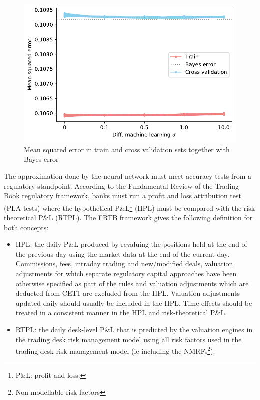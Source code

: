 \begin{figure}[H] 
\centering
\includegraphics[width=1.0\textwidth]{Figures/MarketRisk/train_test_mse.pdf}
\caption{Mean squared error in train and cross validation sets together with Bayes error}
\label{fig:MSE_CV_train_test}
\end{figure}

The approximation done by the neural network must meet accuracy tests from a regulatory standpoint. According to the Fundamental Review of the Trading Book \cite{FRTB} regulatory framework, banks must run a profit and loss attribution test (PLA tests) where the hypothetical P\&L\footnote{P\&L: profit and loss.} (HPL) must be compared with the risk theoretical P\&L (RTPL). The FRTB framework gives the following definition for both concepts:

\begin{itemize}
    \item HPL:  the daily P\&L produced by revaluing the positions held at the end of the
previous day using the market data at the end of the current day. Commissions, fees, intraday
trading and new/modified deals, valuation adjustments for which separate regulatory capital
approaches have been otherwise specified as part of the rules and valuation adjustments which
are deducted from CET1 are excluded from the HPL. Valuation adjustments updated daily should
usually be included in the HPL. Time effects should be treated in a consistent manner in the HPL
and risk-theoretical P\&L.
\item RTPL: the daily desk-level P&L that is predicted by the valuation engines
in the trading desk risk management model using all risk factors used in the trading desk risk
management model (ie including the NMRFs\footnote{Non modellable risk factors}).
\end{itemize}

